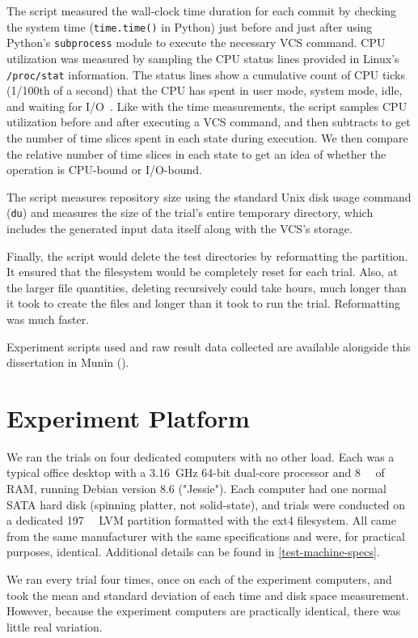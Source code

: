 The script measured the wall-clock time duration for each \gls{commit} by
checking the system time (\lstinline{time.time()} in Python) just before and
just after using Python's \lstinline{subprocess} module to execute the necessary
\gls{VCS} command. CPU utilization was measured by sampling the CPU status lines
provided in Linux's \lstinline{/proc/stat} information. The status lines show a
cumulative count of CPU ticks (\num{1/100}{th} of a second) that the CPU has
spent in user mode, system mode, idle, and waiting for I/O~\cite{proc_man_page}.
Like with the time measurements, the script samples CPU utilization before and
after executing a \gls{VCS} command, and then subtracts to get the number of
time slices spent in each state during execution. We then compare the relative
number of time slices in each state to get an idea of whether the operation is
CPU-bound or I/O-bound.

The script measures \gls{repository} size using the standard Unix disk usage
command (\lstinline{du}) and measures the size of the trial's entire temporary
directory, which includes the generated input data itself along with the
\gls{VCS}'s storage.

Finally, the script would delete the test directories by reformatting the
partition. It ensured that the filesystem would be completely reset for each
trial. Also, at the larger file quantities, deleting recursively could take
hours, much longer than it took to create the files and longer than it took to
run the trial. Reformatting was much faster.


Experiment scripts used and raw result data collected are available alongside
this dissertation in Munin (\muninurl).


\section{Experiment Platform}

We ran the trials on four dedicated computers with no other
load. Each was a typical office desktop with a \SI{3.16}{\giga\hertz}
\num{64}-bit dual-core processor and \SI{8}{\gibi\byte} of RAM, running Debian
version 8.6 ("Jessie"). Each computer had one normal SATA hard disk (spinning
platter, not solid-state), and trials were conducted on a dedicated
\SI{197}{\gibi\byte} LVM partition formatted with the ext4 filesystem. All came
from the same manufacturer with the same specifications and were, for practical purposes,
identical.
Additional details can be found in \autoref{test-machine-specs}.

We ran every trial four times, once on each of the experiment computers, and
took the mean and standard deviation of each time and disk space measurement.
However, because the experiment computers are practically identical, there was
little real variation.
